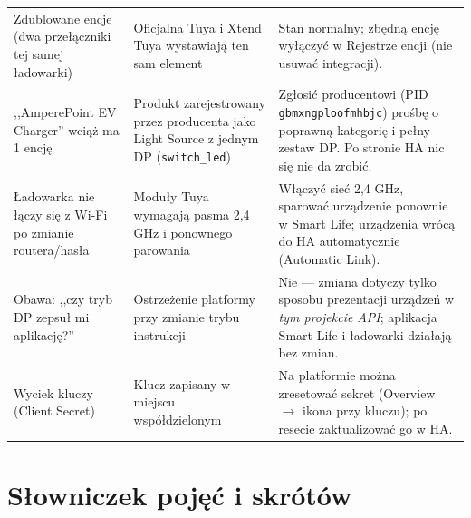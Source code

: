 \documentclass[11pt,a4paper]{article}
\begin{document}
\begin{longtable}{>{\raggedright\arraybackslash}p{4.2cm} >{\raggedright\arraybackslash}p{4.6cm} >{\raggedright\arraybackslash}p{5.6cm}}
\addlinespace
Zdublowane encje (dwa przełączniki tej samej ładowarki) & Oficjalna Tuya i Xtend Tuya wystawiają ten sam element & Stan normalny; zbędną encję wyłączyć w Rejestrze encji (nie usuwać integracji).\\
\addlinespace
,,AmperePoint EV Charger'' wciąż ma 1 encję & Produkt zarejestrowany przez producenta jako Light Source z jednym DP (\texttt{switch\_led}) & Zgłosić producentowi (PID \texttt{gbmxngploofmhbjc}) prośbę o poprawną kategorię i pełny zestaw DP. Po stronie HA nic się nie da zrobić.\\
\addlinespace
Ładowarka nie łączy się z Wi-Fi po zmianie routera/hasła & Moduły Tuya wymagają pasma 2,4 GHz i ponownego parowania & Włączyć sieć 2,4 GHz, sparować urządzenie ponownie w Smart Life; urządzenia wrócą do HA automatycznie (Automatic Link).\\
\addlinespace
Obawa: ,,czy tryb DP zepsuł mi aplikację?'' & Ostrzeżenie platformy przy zmianie trybu instrukcji & Nie --- zmiana dotyczy tylko sposobu prezentacji urządzeń w \emph{tym projekcie API}; aplikacja Smart Life i ładowarki działają bez zmian.\\
\addlinespace
Wyciek kluczy (Client Secret) & Klucz zapisany w miejscu współdzielonym & Na platformie można zresetować sekret (Overview $\to$ ikona przy kluczu); po resecie zaktualizować go w HA.\\
\bottomrule
\end{longtable}

\section{Słowniczek pojęć i skrótów}
\label{sec:slowniczek}
\end{document}
